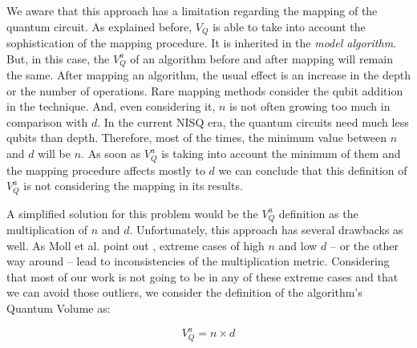 \documentclass[11pt]{article}
\begin{document}
We aware that this approach has a limitation regarding the mapping of the quantum circuit.
As explained before, \(V_Q\) is able to take into account the sophistication of the mapping procedure.
It is inherited in the \emph{model algorithm}.
But, in this case, the \(V^a_Q\) of an algorithm before and after mapping will remain the same.
After mapping an algorithm, the usual effect is an increase in the depth or the number of operations.
Rare mapping methods consider the qubit addition in the technique.
And, even considering it, \(n\) is not often growing too much in comparison with \(d\).
In the current NISQ era, the quantum circuits need much less qubits than depth.
Therefore, most of the times, the minimum value between \(n\) and \(d\) will be \(n\).
As soon as \(V^a_Q\) is taking into account the minimum of them and the mapping procedure affects mostly to \(d\) we can conclude that this definition of \(V^a_Q\) is not considering the mapping in its results.

A simplified solution for this problem would be the \(V^a_Q\) definition as the multiplication of \(n\) and \(d\).
Unfortunately, this approach has several drawbacks as well.
As Moll et al. point out \cite{Moll_2018}, extreme cases of high \(n\) and low \(d\) -- or the other way around -- lead to inconsistencies of the multiplication metric.
Considering that most of our work is not going to be in any of these extreme cases and that we can avoid those outliers, we consider the definition of the algorithm's Quantum Volume as:

$$V_Q^a =  n \times d$$

\end{document}
